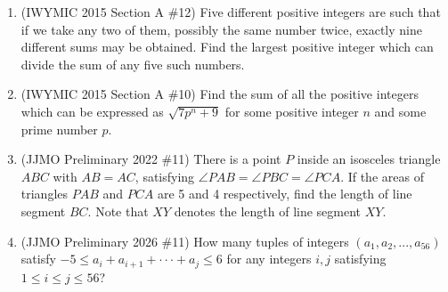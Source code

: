 \documentclass[11pt,letterpaper]{article}
\begin{document}
\begin{enumerate}[resume]
    \item (IWYMIC 2015 Section A \#12) Five different positive integers are such that if we take any two of them, possibly the same number twice, exactly nine different sums may be obtained. Find the largest positive integer which can divide the sum of any five such numbers.

    \item (IWYMIC 2015 Section A \#10) Find the sum of all the positive integers which can be expressed as $\sqrt{7p^n+9}$ for some positive integer $n$ and some prime number $p$.

    \item (JJMO Preliminary 2022 \#11) There is a point $P$ inside an isosceles triangle $ABC$ with $AB=AC$, satisfying $\angle PAB=\angle PBC=\angle PCA$. If the areas of triangles $PAB$ and $PCA$ are 5 and 4 respectively, find the length of line segment $BC$. Note that $XY$ denotes the length of line segment $XY$.

    \item (JJMO Preliminary 2026 \#11) How many tuples of integers $(a_{1},a_{2},...,a_{56})$ satisfy $-5\le a_{i}+a_{i+1}+\cdot\cdot\cdot+a_{j}\le 6$ for any integers $i, j$ satisfying $1\le i\le j\le 56$?
\end{enumerate}
\end{document}
